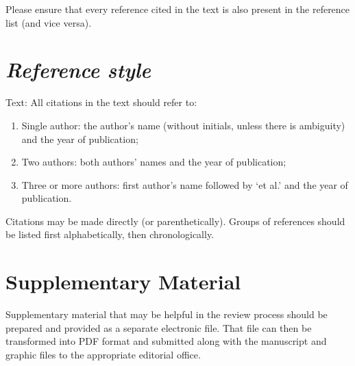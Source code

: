 \documentclass[times,onecolumn,final,longtitle]{elsarticle}
\begin{document}
Please ensure that every reference cited in the text is also present in
the reference list (and vice versa).

\section*{\itshape Reference style}

Text: All citations in the text should refer to:
\begin{enumerate}
\item Single author: the author's name (without initials, unless there
is ambiguity) and the year of publication;
\item Two authors: both authors' names and the year of publication;
\item Three or more authors: first author's name followed by `et al.'
and the year of publication.
\end{enumerate}
Citations may be made directly (or parenthetically). Groups of
references should be listed first alphabetically, then chronologically.



\section*{Supplementary Material}

Supplementary material that may be helpful in the review process should
be prepared and provided as a separate electronic file. That file can
then be transformed into PDF format and submitted along with the
manuscript and graphic files to the appropriate editorial office.
\end{document}
